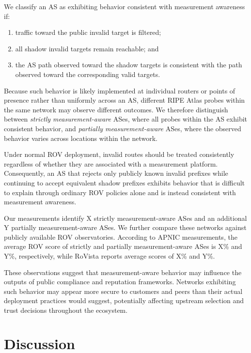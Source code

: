 \documentclass[sigconf, 10pt, anonymous, nonacm]{acmart}
\begin{document}
We classify an AS as exhibiting behavior consistent with measurement awareness if:

\begin{enumerate}
\item traffic toward the public invalid target is filtered;
\item all shadow invalid targets remain reachable; and
\item the AS path observed toward the shadow targets is consistent with the path observed toward the corresponding valid targets.
\end{enumerate}

Because such behavior is likely implemented at individual routers or points of presence rather than uniformly across an AS, different RIPE Atlas probes within the same network may observe different outcomes. We therefore distinguish between \emph{strictly measurement-aware} ASes, where all probes within the AS exhibit consistent behavior, and \emph{partially measurement-aware} ASes, where the observed behavior varies across locations within the network.

Under normal ROV deployment, invalid routes should be treated consistently regardless of whether they are associated with a measurement platform. Consequently, an AS that rejects only publicly known invalid prefixes while continuing to accept equivalent shadow prefixes exhibits behavior that is difficult to explain through ordinary ROV policies alone and is instead consistent with measurement awareness.

Our measurements identify X strictly measurement-aware ASes and an additional Y partially measurement-aware ASes. We further compare these networks against publicly available ROV observatories. According to APNIC measurements, the average ROV score of strictly and partially measurement-aware ASes is X\% and Y\%, respectively, while RoVista reports average scores of X\% and Y\%.

These observations suggest that measurement-aware behavior may influence the outputs of public compliance and reputation frameworks. Networks exhibiting such behavior may appear more secure to customers and peers than their actual deployment practices would suggest, potentially affecting upstream selection and trust decisions throughout the ecosystem.

\section{Discussion}
\end{document}

